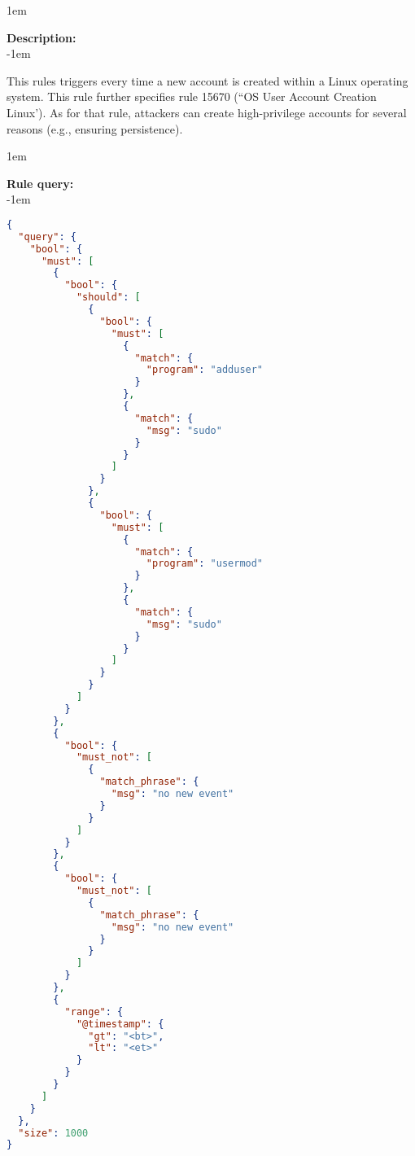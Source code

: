\openup 1em

{\bf Description:} \\

\openup -1em
\vspace{-2em}


This rules triggers every time a new account is created within a Linux operating system. This rule further specifies rule 15670 (``OS User Account Creation Linux'). As for that rule, attackers can create high-privilege accounts for several reasons (e.g., ensuring persistence).

\openup 1em

{\bf Rule query:} \\

\openup -1em
\vspace{-2em}

\begin{lstlisting}[language=json,firstnumber=1]
{
  "query": {
    "bool": {
      "must": [
        {
          "bool": {
            "should": [
              {
                "bool": {
                  "must": [
                    {
                      "match": {
                        "program": "adduser"
                      }
                    },
                    {
                      "match": {
                        "msg": "sudo"
                      }
                    }
                  ]
                }
              },
              {
                "bool": {
                  "must": [
                    {
                      "match": {
                        "program": "usermod"
                      }
                    },
                    {
                      "match": {
                        "msg": "sudo"
                      }
                    }
                  ]
                }
              }
            ]
          }
        },
        {
          "bool": {
            "must_not": [
              {
                "match_phrase": {
                  "msg": "no new event"
                }
              }
            ]
          }
        },
        {
          "bool": {
            "must_not": [
              {
                "match_phrase": {
                  "msg": "no new event"
                }
              }
            ]
          }
        },
        {
          "range": {
            "@timestamp": {
              "gt": "<bt>",
              "lt": "<et>"
            }
          }
        }
      ]
    }
  },
  "size": 1000
}
\end{lstlisting}

